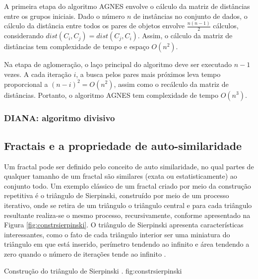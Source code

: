 A primeira etapa do algoritmo AGNES envolve o cálculo da matriz de distâncias
entre os grupos iniciais. Dado o número $n$ de instâncias no conjunto de dados,
o cálculo da distância entre todos os pares de objetos envolve
$ \frac{n \left(n-1\right)}{2}$ cálculos, considerando
$dist(C_i,C_j) = dist(C_j,C_i)$. Assim, o cálculo da matriz de distâncias
tem complexidade de tempo e espaço $O\left(n^2\right)$.

Na etapa de aglomeração, o laço principal do algoritmo deve ser executado $n-1$
vezes. A cada iteração $i$, a busca pelos pares mais próximos leva tempo 
proporcional a $\left(n-i\right)^2 = O\left(n^2\right)$, assim como o recálculo
da matriz de distâncias. Portanto, o algoritmo AGNES tem complexidade de tempo
$O\left(n^3\right)$.

\subsubsection{DIANA: algoritmo divisivo}





\subsection{Fractais e a propriedade de auto-similaridade}
	\label{subsec:fractais}

Um fractal pode ser definido pelo conceito de auto similaridade, no qual partes
de qualquer tamanho de um fractal são similares (exata ou estatisticamente) ao
conjunto todo. Um exemplo clássico de um fractal criado por meio da construção
repetitiva é o triângulo de Sierpinski, construído por meio de um processo
iterativo, onde se retira de um triângulo o triângulo central e para cada
triângulo resultante realiza-se o mesmo processo, recursivamente, conforme
apresentado na Figura \ref{fig:constrsierpinski}. O triângulo de Sierpinski
apresenta características interessantes, como o fato de cada triângulo interior
ser uma miniatura do triângulo em que está inserido, perímetro tendendo ao
infinito e área tendendo a zero quando o número de iterações tende ao infinito
\cite{Schroeder91}. 

{Construção do triângulo de Sierpinski \cite{Schroeder91}.}
{fig:constrsierpinski}

